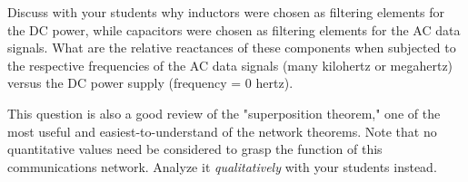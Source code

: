 





Discuss with your students why inductors were chosen as filtering elements for the DC power, while capacitors were chosen as filtering elements for the AC data signals.  What are the relative reactances of these components when subjected to the respective frequencies of the AC data signals (many kilohertz or megahertz) versus the DC power supply (frequency = 0 hertz).

This question is also a good review of the "superposition theorem," one of the most useful and easiest-to-understand of the network theorems.  Note that no quantitative values need be considered to grasp the function of this communications network.  Analyze it {\it qualitatively} with your students instead.




